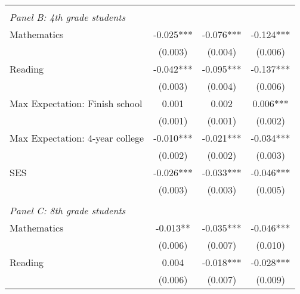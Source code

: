 {\begin{tabular}{lccc}
&  &  &   \\
\multicolumn{4}{l}{\textit{Panel B: 4th grade students}} \\
\hspace{3mm}Mathematics&      -0.025***&      -0.076***&      -0.124***\\
                    &     (0.003)   &     (0.004)   &     (0.006)   \\
 
\hspace{3mm}Reading &      -0.042***&      -0.095***&      -0.137***\\
                    &     (0.003)   &     (0.004)   &     (0.006)   \\
 
\hspace{3mm}Max Expectation: Finish school&       0.001   &       0.002   &       0.006***\\
                    &     (0.001)   &     (0.001)   &     (0.002)   \\
 
\hspace{3mm}Max Expectation: 4-year college&      -0.010***&      -0.021***&      -0.034***\\
                    &     (0.002)   &     (0.002)   &     (0.003)   \\
 
\hspace{3mm}SES     &      -0.026***&      -0.033***&      -0.046***\\
                    &     (0.003)   &     (0.003)   &     (0.005)   \\
 
&  &  &   \\
\multicolumn{4}{l}{\textit{Panel C: 8th grade students}} \\
\hspace{3mm}Mathematics&      -0.013** &      -0.035***&      -0.046***\\
                    &     (0.006)   &     (0.007)   &     (0.010)   \\
 
\hspace{3mm}Reading &       0.004   &      -0.018***&      -0.028***\\
                    &     (0.006)   &     (0.007)   &     (0.009)   \\
 

\end{tabular}}
